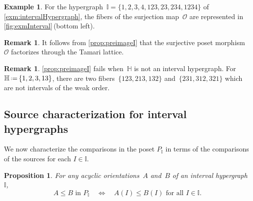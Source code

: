 \documentclass{amsart}
\newtheorem{proposition}[theorem]{Proposition}
\theoremstyle{definition}
\newtheorem{example}[theorem]{Example}
\newtheorem{remark}[theorem]{Remark}
\newcommand{\eqdef}{\mbox{\,\raisebox{0.2ex}{\scriptsize\ensuremath{\mathrm:}}\ensuremath{=}\,}} %
\newcommand{\Or}{\mathcal O}  %
\newcommand{\HH}{\mathbb H}  %
\newcommand{\II}{\mathbb I} %
\begin{document}
\begin{example}
For the hypergraph~$\II = \{ 1, 2, 3, 4,123, 23, 234, 1234 \}$ of \cref{exm:intervalHypergraph}, the fibers of the surjection map~$\Or$ are represented in \cref{fig:exmInterval}\,(bottom left).
\end{example}

\begin{remark}
\label{prop:surjectionFactorizeI}
It follows from \cref{prop:preimageI} that the surjective poset morphism~$\Or$ factorizes through the Tamari lattice.
\end{remark}

\begin{remark}
\cref{prop:preimageI} fails when~$\HH$ is not an interval hypergraph.
For~$\HH \eqdef \{1, 2, 3, 13\}$, there are two fibers~$\{123, 213, 132\}$ and~$\{231, 312, 321\}$ which are not intervals of the weak order.
\end{remark}


\subsection{Source characterization for interval hypergraphs}  
\label{subsec:sourceAcyclicI}

We now characterize the comparisons in the poset $P_\II$ in terms of the comparisons of the sources for each $I\in \II$.

\begin{proposition}
\label{prop:sourceOrderI}
For any acyclic orientations~$A$ and~$B$ of an interval hypergraph~$\II$,
\[
A \le B \text{ in } P_\II \quad \iff \quad A(I) \le B(I) \text{ for all } I \in \II .
\]
\end{proposition}
\end{document}
